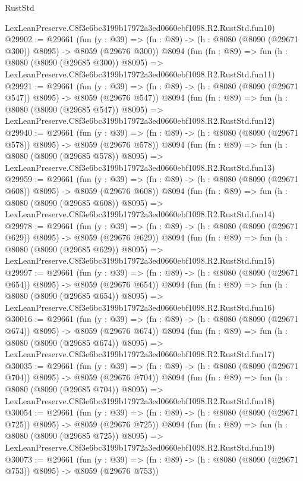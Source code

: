 \begin{lexlean}{RustStd}
\begin{coremodule}
    LexLeanPreserve.C8f3e6bc3199b17972a3ed0660ebf1098.R2.RustStd.fun10)
@29902 := @29661
    (fun (y : @39) => (fn : @89) -> (h : @8080 (@8090 (@29671 @300)) @8095) -> @8059 (@29676 @300))
    @8094
    (fun (fn : @89) =>
    fun (h : @8080 (@8090 (@29685 @300)) @8095) =>
    LexLeanPreserve.C8f3e6bc3199b17972a3ed0660ebf1098.R2.RustStd.fun11)
@29921 := @29661
    (fun (y : @39) => (fn : @89) -> (h : @8080 (@8090 (@29671 @547)) @8095) -> @8059 (@29676 @547))
    @8094
    (fun (fn : @89) =>
    fun (h : @8080 (@8090 (@29685 @547)) @8095) =>
    LexLeanPreserve.C8f3e6bc3199b17972a3ed0660ebf1098.R2.RustStd.fun12)
@29940 := @29661
    (fun (y : @39) => (fn : @89) -> (h : @8080 (@8090 (@29671 @578)) @8095) -> @8059 (@29676 @578))
    @8094
    (fun (fn : @89) =>
    fun (h : @8080 (@8090 (@29685 @578)) @8095) =>
    LexLeanPreserve.C8f3e6bc3199b17972a3ed0660ebf1098.R2.RustStd.fun13)
@29959 := @29661
    (fun (y : @39) => (fn : @89) -> (h : @8080 (@8090 (@29671 @608)) @8095) -> @8059 (@29676 @608))
    @8094
    (fun (fn : @89) =>
    fun (h : @8080 (@8090 (@29685 @608)) @8095) =>
    LexLeanPreserve.C8f3e6bc3199b17972a3ed0660ebf1098.R2.RustStd.fun14)
@29978 := @29661
    (fun (y : @39) => (fn : @89) -> (h : @8080 (@8090 (@29671 @629)) @8095) -> @8059 (@29676 @629))
    @8094
    (fun (fn : @89) =>
    fun (h : @8080 (@8090 (@29685 @629)) @8095) =>
    LexLeanPreserve.C8f3e6bc3199b17972a3ed0660ebf1098.R2.RustStd.fun15)
@29997 := @29661
    (fun (y : @39) => (fn : @89) -> (h : @8080 (@8090 (@29671 @654)) @8095) -> @8059 (@29676 @654))
    @8094
    (fun (fn : @89) =>
    fun (h : @8080 (@8090 (@29685 @654)) @8095) =>
    LexLeanPreserve.C8f3e6bc3199b17972a3ed0660ebf1098.R2.RustStd.fun16)
@30016 := @29661
    (fun (y : @39) => (fn : @89) -> (h : @8080 (@8090 (@29671 @674)) @8095) -> @8059 (@29676 @674))
    @8094
    (fun (fn : @89) =>
    fun (h : @8080 (@8090 (@29685 @674)) @8095) =>
    LexLeanPreserve.C8f3e6bc3199b17972a3ed0660ebf1098.R2.RustStd.fun17)
@30035 := @29661
    (fun (y : @39) => (fn : @89) -> (h : @8080 (@8090 (@29671 @704)) @8095) -> @8059 (@29676 @704))
    @8094
    (fun (fn : @89) =>
    fun (h : @8080 (@8090 (@29685 @704)) @8095) =>
    LexLeanPreserve.C8f3e6bc3199b17972a3ed0660ebf1098.R2.RustStd.fun18)
@30054 := @29661
    (fun (y : @39) => (fn : @89) -> (h : @8080 (@8090 (@29671 @725)) @8095) -> @8059 (@29676 @725))
    @8094
    (fun (fn : @89) =>
    fun (h : @8080 (@8090 (@29685 @725)) @8095) =>
    LexLeanPreserve.C8f3e6bc3199b17972a3ed0660ebf1098.R2.RustStd.fun19)
@30073 := @29661
    (fun (y : @39) => (fn : @89) -> (h : @8080 (@8090 (@29671 @753)) @8095) -> @8059 (@29676 @753))

\end{coremodule}
\end{lexlean}
